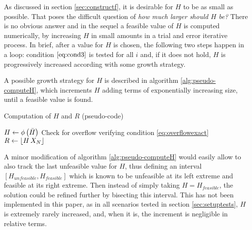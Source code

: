 \documentclass[preprint,1p,times]{elsarticle}
\begin{document}
As discussed in section \ref{sec:constructf}, it is desirable for $H$ to be as small as possible. That poses the difficult question of \textit{how much larger should $H$ be?} There is no obvious answer and in the sequel a feasible value of $H$ is computed numerically, by increasing $H$ in small amounts in a trial and error iterative process. In brief, after a value for $H$ is chosen, the following two steps happen in a loop: condition $\eqref{eq:cond3}$ is tested for all $i$ and, if it does not hold, $H$ is progressively increased according with some growth strategy. 

A possible growth strategy for $H$ is described in algorithm \ref{alg:pseudo-computeH}, which increments $H$ adding terms of exponentially increasing size, until a feasible value is found. 
\begin{algorithm}
	\caption{Computation of $H$ and $R$ (pseudo-code)}
	\label{alg:pseudo-computeH}
	\begin{algorithmic}
			\State	$H \leftarrow \phi\left(\bar{H}\right)$ 
			 
			\EndIf
	     	 
					 
				\EndIf
				 
					 
					 \Comment Check for overflow verifying condition \eqref{eq:overflowexact}
					\EndIf 
					 
				\EndWhile
			\EndFor
			\State $R \leftarrow \left \lfloor H\, X_N \right \rfloor$ 
		\EndFunction
	\end{algorithmic}
\end{algorithm}

A minor modification of algorithm \ref{alg:pseudo-computeH} would easily allow to also track the last unfeasible value for $H$, thus defining an interval $[H_{unfeasible},H_{feasible}]$ which is known to be unfeasible at its left extreme and feasible at its right extreme. Then instead of simply taking $H=H_{feasible}$, the solution could be refined further by bisecting this interval. This has not been implemented in this paper, as in all scenarios tested in section \ref{sec:setuptests}, $H$ is extremely rarely increased, and, when it is, the increment is negligible in relative terms.
\end{document}
